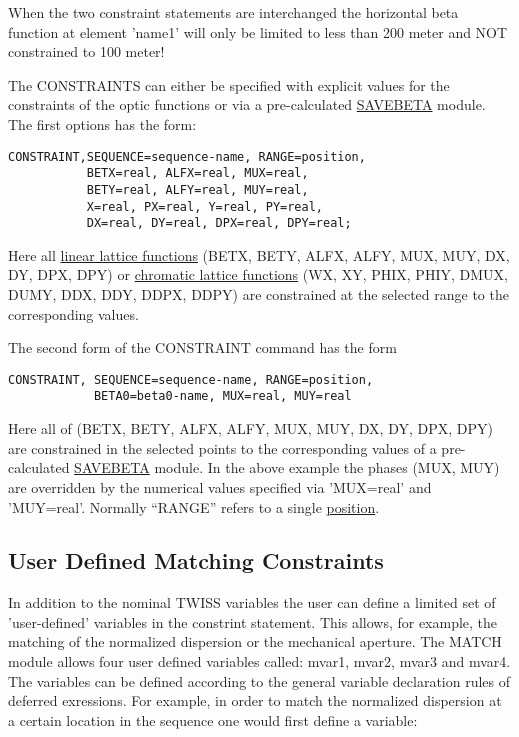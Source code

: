 When the two constraint statements are interchanged the horizontal beta
function at element 'name1' will only be limited to less than 200 meter
and NOT constrained to 100 meter! 

The CONSTRAINTS can either be specified with explicit values for the
constraints of the optic functions or via a pre-calculated
\href{../control/general.html#savebeta}{SAVEBETA} module. The first
options has the form: 
\begin{verbatim}
CONSTRAINT,SEQUENCE=sequence-name, RANGE=position,
           BETX=real, ALFX=real, MUX=real,                                            
           BETY=real, ALFY=real, MUY=real,
           X=real, PX=real, Y=real, PY=real,
           DX=real, DY=real, DPX=real, DPY=real;

\end{verbatim}

Here all \href{../Introduction/tables.html#linear}{linear lattice functions} 
(BETX, BETY, ALFX, ALFY, MUX, MUY, DX, DY, DPX, DPY)
or \href{../Introduction/tables.html#chrom}{chromatic lattice functions}
(WX, XY, PHIX, PHIY, DMUX, DUMY, DDX, DDY, DDPX, DDPY)
are constrained at the selected range to the corresponding values.

The second form of the CONSTRAINT command has the form
\begin{verbatim}
CONSTRAINT, SEQUENCE=sequence-name, RANGE=position,
            BETA0=beta0-name, MUX=real, MUY=real
\end{verbatim}

Here all of (BETX, BETY, ALFX, ALFY, MUX, MUY, DX, DY, DPX, DPY)
are constrained in the selected points to the corresponding values
of a pre-calculated \href{../control/general.html#savebeta}{SAVEBETA} module.
In the above example
the phases (MUX, MUY) are overridden by the numerical values specified via
'MUX=real' and 'MUY=real'.
Normally ``RANGE'' refers to a single
\href{../Introduction/ranges.html#position}{position}.

\subsection{User Defined Matching Constraints}
\label{subsec:match_con_user}

In addition to the nominal TWISS variables the user can define a limited
set of 'user-defined' variables in the constrint statement. This allows,
for example, the matching of the normalized dispersion or the mechanical
aperture. The MATCH module allows four user defined variables called:
mvar1, mvar2, mvar3 and mvar4. The variables can be defined according to
the general variable declaration rules of deferred exressions. For
example, in order to match the normalized dispersion at a certain
location in the sequence one would first define a variable:  

